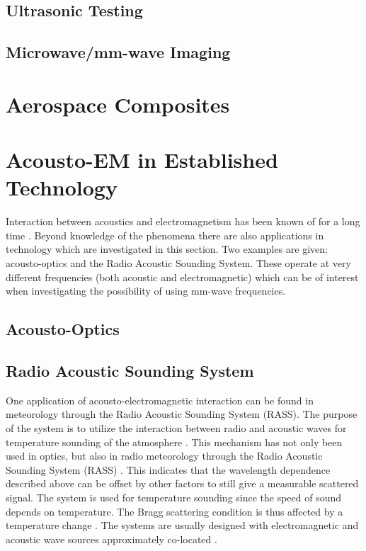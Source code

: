 \documentclass[11pt,twoside]{eitExjobb}
\begin{document}
	\subsection{Ultrasonic Testing}
	
	\subsection{Microwave/mm-wave Imaging}
	
	\section{Aerospace Composites}
	
	\section{Acousto-EM in Established Technology}
	Interaction between acoustics and electromagnetism has been known of for a long time \addref. Beyond knowledge of the phenomena there are also applications in technology which are investigated in this section. Two examples are given: acousto-optics and the Radio Acoustic Sounding System. These operate at very different frequencies (both acoustic and electromagnetic) which can be of interest when investigating the possibility of using mm-wave frequencies.
	
	\subsection{Acousto-Optics}
	
	\subsection{Radio Acoustic Sounding System}
	One application of acousto-electromagnetic interaction can be found in meteorology through the Radio Acoustic Sounding System (RASS). The purpose of the system is to utilize the interaction between radio and acoustic waves for temperature sounding of the atmosphere .
	This mechanism has not only been used in optics, but also in radio meteorology through the Radio Acoustic Sounding System (RASS) \cite{Buerkle2007}. This indicates that the wavelength dependence described above can be offset by other factors to still give a measurable scattered signal. The system is used for temperature sounding since the speed of sound depends on temperature. The Bragg scattering condition is thus affected by a temperature change \cite{Marshall1972}. The systems are usually designed with electromagnetic and acoustic wave sources approximately co-located \cite{Marshall1972}.
	
\end{document}
